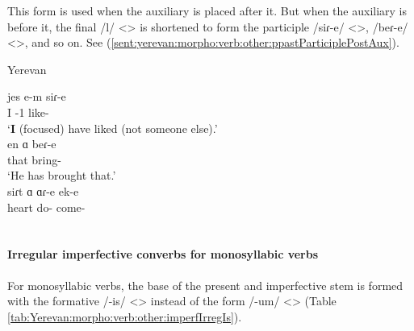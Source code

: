 This form is used when the auxiliary is placed after it. But when the auxiliary is before it, the final /l/ <> is shortened to form the participle /siɾ-e/ <>, /beɾ-e/ <>, and so on. See (\ref{sent:yerevan:morpho:verb:other:ppastParticiplePostAux}). 

\begin{exe}
	\ex Yerevan \label{sent:yerevan:morpho:verb:other:ppastParticiplePostAux}\begin{xlist}
		\ex \gll jes e-m siɾ-e \\
		I {\aux}-1{\sg} like-{\perfcvb} \\ 
		\trans `\textbf{I} (focused) have liked (not someone else).'
		\\  
		\ex \gll en ɑ beɾ-e \\
		that {\aux} bring-{\perfcvb} \\ 
		\trans `He has brought that.'
		\\ 
		\ex \gll siɾt ɑ ɑɾ-e ek-e\\
		heart {\aux} do-{\perfcvb} come-{\perfcvb} \\ 
		\trans \translatorHD{I'm not sure what this means}
		\\ 
	\end{xlist}
\end{exe}



\paragraph{Irregular imperfective converbs for monosyllabic verbs }

For monosyllabic verbs, the base of the present and imperfective stem is formed with the formative /-is/ <> instead of the form /-um/ <> (Table \ref{tab:Yerevan:morpho:verb:other:imperfIrregIs}). 




